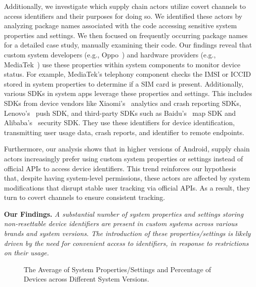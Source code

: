 Additionally, we investigate which supply chain actors utilize covert channels to access identifiers and their purposes for doing so. 
We identified these actors by analyzing package names associated with the code accessing sensitive system properties and settings. We then focused on frequently occurring package names for a detailed case study, manually examining their code.
Our findings reveal that custom system developers (e.g., Oppo~\cite{oppo}) and hardware providers (e.g., MediaTek~\cite{mediatek}) use these properties within system components to monitor device status. 
For example, MediaTek's telephony component checks the IMSI or ICCID stored in system properties to determine if a SIM card is present.
Additionally, various SDKs in system apps leverage these properties and settings. 
This includes SDKs from device vendors like Xiaomi's~\cite{xiaomi} analytics and crash reporting SDKs, Lenovo's~\cite{lenovo} push SDK, and third-party SDKs such as Baidu's~\cite{baidu} map SDK and Alibaba's~\cite{alibaba} security SDK.
They use these identifiers for device identification, transmitting user usage data, crash reports, and identifier to remote endpoints.

Furthermore, our analysis shows that in higher versions of Android, supply chain actors increasingly prefer using custom system properties or settings instead of official APIs to access device identifiers. 
This trend reinforces our hypothesis that, despite having system-level permissions, these actors are affected by system modifications that disrupt stable user tracking via official APIs. 
As a result, they turn to covert channels to ensure consistent tracking.

\noindent \textbf{Our Findings.}
\textit{A substantial number of system properties and settings storing non-resettable device identifiers are present in custom systems across various brands and system versions. 
The introduction of these properties/settings is likely driven by the need for convenient access to identifiers, in response to restrictions on their usage.}


\begin{figure}[h]
  \centering
  \caption{The Average of System Properties/Settings and  Percentage of Devices across Different System Versions.}
  \label{fig:staticversion}
\end{figure}


